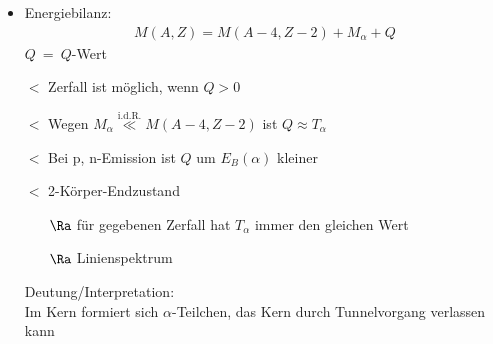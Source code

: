 \begin{itemize}
\item Energiebilanz:
\begin{align}
\boxed{
M(A,Z) = M(A-4, Z-2) + M_\alpha + Q
}
\end{align}
$Q\ =\ Q$-Wert
\item[$\lt$] Zerfall ist möglich, wenn $Q>0$
\item[$\lt$] Wegen $M_\alpha \overset{\text{i.d.R.}}{\ll} M(A-4, Z-2)$ ist $Q\approx T_\alpha$
\item[$\lt$] Bei p, n-Emission ist $Q$ um $E_B(\alpha)$ kleiner
\item[$\lt$] 2-Körper-Endzustand
\begin{itemize}
\item[$\Ra$] für gegebenen Zerfall hat $T_\alpha$ immer den gleichen Wert
\item[$\Ra$] \glqq Linienspektrum\grqq
\end{itemize}
Deutung/Interpretation:\\
Im Kern formiert sich $\alpha$-Teilchen, das Kern durch Tunnelvorgang verlassen kann


\end{itemize}
